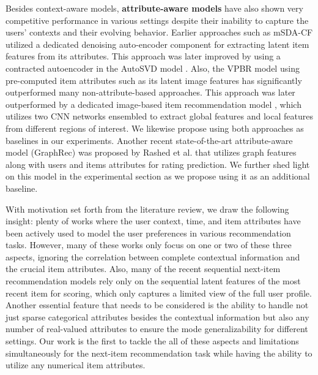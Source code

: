 \documentclass[sigconf,natbib=true]{acmart}
\begin{document}
Besides context-aware models, \textbf{attribute-aware models} have also shown very competitive performance in various settings despite their inability to capture the users' contexts and their evolving behavior. Earlier approaches such as mSDA-CF \cite{li2015deep} utilized a dedicated denoising auto-encoder component for extracting latent item features from its attributes. This approach was later improved by using a contracted autoencoder in the AutoSVD model \cite{zhang2017autosvd++}. Also, the VPBR model \cite{he2016vbpr} using pre-computed item attributes such as its latent image features has significantly outperformed many non-attribute-based approaches. This approach was later outperformed by a dedicated image-based item recommendation model \cite{ijcai2019650}, which utilizes two CNN networks ensembled to extract global features and local features from different regions of interest. We likewise propose using both approaches as baselines in our experiments. Another recent state-of-the-art attribute-aware model (GraphRec) was proposed by Rashed et al. \cite{rashed2019attribute} that utilizes graph features along with users and items attributes for rating prediction. We further shed light on this model in the experimental section as we propose using it as an additional baseline. 

With motivation set forth from the literature review, we draw the following insight: plenty of works where the user context, time, and item attributes have been actively used to model the user preferences in various recommendation tasks. However, many of these works only focus on one or two of these three aspects, ignoring the correlation between complete contextual information and the crucial item attributes. Also, many of the recent sequential next-item recommendation models rely only on the sequential latent features of the most recent item for scoring, which only captures a limited view of the full user profile. Another essential feature that needs to be considered is the ability to handle not just sparse categorical attributes besides the contextual information but also any number of real-valued attributes to ensure the mode generalizability for different settings. Our work is the first to tackle the all of these aspects and limitations simultaneously for the next-item recommendation task while having the ability to utilize any numerical item attributes.
\makeatletter
\DeclareRobustCommand*\cal{\@fontswitch\relax\mathcal}
\makeatother
\newcommand\N{{\mathbb N}}
\newcommand\R{{\mathbb R}}
\newcommand\argmax{\arg\,\text{max}}
\end{document}

